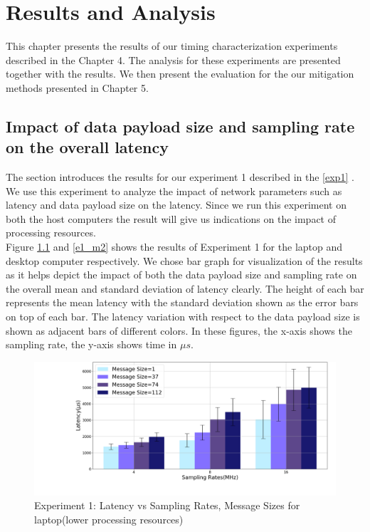 \chapter{Results and Analysis}

This chapter presents the results of our timing characterization experiments described in the Chapter 4.
The analysis for these experiments are presented together with the results.
We then present the evaluation for the our mitigation methods presented in Chapter 5.

\section{Impact of data payload size and sampling rate on the overall latency}
The section introduces the results for our experiment 1 described in the \ref{exp1} . 
We use this experiment to analyze the impact of network parameters such as latency and data payload size on the latency.
Since we run this experiment on both the host computers the result will give us indications on the impact of processing resources.\\

Figure \ref{e1_m1} and \ref{e1_m2} shows the results of Experiment 1 for the laptop and desktop computer respectively.
We chose bar graph for visualization of the results as it helps depict the impact of both the data payload size and sampling rate on the overall mean and standard deviation of latency clearly.
The height of each bar represents the mean latency with the standard deviation shown as the error bars on top of each bar.
The latency variation with respect to the data payload size is shown as adjacent bars of different colors.
In these figures, the x-axis shows the sampling rate, the y-axis shows time in $\mu s$.\\

\begin{figure}[h!]
\centering
\includegraphics[width=\textwidth]{Thesis/Figure/E1_M1.png}
\caption{Experiment 1: Latency vs Sampling Rates, Message Sizes for laptop(lower processing resources)}
\label{e1_m1}
\end{figure}

